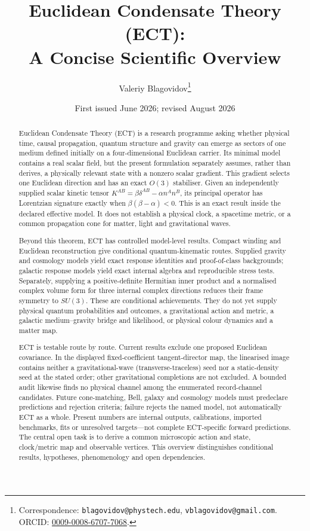 \documentclass[11pt,a4paper]{article}
\title{\textbf{Euclidean Condensate Theory (ECT):\\
A Concise Scientific Overview}}
\author{Valeriy Blagovidov\thanks{Correspondence:
\texttt{blagovidov@phystech.edu},
\texttt{vblagovidov@gmail.com}.\,
ORCID: \href{https://orcid.org/0009-0008-6707-7068}{0009-0008-6707-7068}.}}
\date{First issued June 2026; revised August 2026}
\begin{document}
\maketitle

\begin{abstract}
Euclidean Condensate Theory (ECT) is a research programme asking whether
physical time, causal propagation, quantum structure and gravity can emerge
as sectors of one medium defined initially on a four-dimensional Euclidean
carrier.  Its minimal model contains a real scalar field, but the present
formulation separately assumes, rather than derives, a physically relevant
state with a nonzero scalar gradient.  This gradient selects one Euclidean
direction and has an exact $O(3)$ stabiliser.  Given an independently supplied
scalar kinetic tensor
$K^{AB}=\beta\delta^{AB}-\alpha n^An^B$, its principal operator has
Lorentzian signature exactly when $\beta(\beta-\alpha)<0$.  This is an exact
result inside the declared effective model.  It does not establish a physical
clock, a spacetime metric, or a common propagation cone for matter, light and
gravitational waves.

Beyond this theorem, ECT has controlled model-level results.  Compact winding
and Euclidean reconstruction give conditional quantum-kinematic routes.
Supplied gravity and cosmology models yield exact response identities and
proof-of-class backgrounds; galactic response models yield exact internal
algebra and reproducible stress tests.  Separately, supplying a
positive-definite Hermitian inner product and a normalised complex volume form
for three
internal complex directions reduces their frame symmetry to $SU(3)$.  These
are conditional achievements.  They do not yet supply physical quantum
probabilities and outcomes, a gravitational action and metric, a galactic
medium--gravity bridge and likelihood, or physical colour dynamics and a
matter map.

ECT is testable route by route.  Current results exclude one proposed
Euclidean covariance.  In the displayed fixed-coefficient tangent-director
map, the linearised image contains neither a gravitational-wave
(transverse-traceless) seed nor a static-density seed at the stated order;
other gravitational completions are not excluded.  A bounded audit likewise
finds no physical channel among the enumerated record-channel candidates.
Future cone-matching,
Bell, galaxy and cosmology models must
predeclare predictions and rejection criteria; failure rejects the named
model, not automatically ECT as a whole.  Present numbers are internal
outputs, calibrations, imported benchmarks, fits or unresolved targets---not
complete ECT-specific forward predictions.  The central open task is to derive
a common microscopic action and state, clock/metric map and observable
vertices.  This overview distinguishes conditional results, hypotheses,
phenomenology and open dependencies.
\end{abstract}
\end{document}
